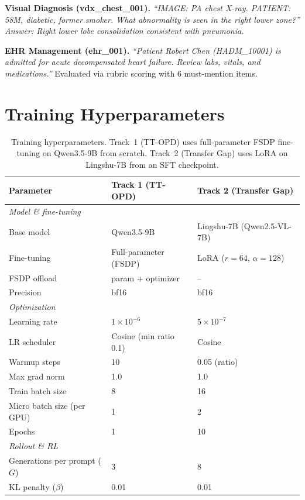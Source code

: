 \documentclass{article}
\begin{document}
\textbf{Visual Diagnosis (vdx\_chest\_001).} \emph{``IMAGE: PA chest X-ray. PATIENT: 58M, diabetic, former smoker. What abnormality is seen in the right lower zone?''} \emph{Answer: Right lower lobe consolidation consistent with pneumonia.}

\textbf{EHR Management (ehr\_001).} \emph{``Patient Robert Chen (HADM\_10001) is admitted for acute decompensated heart failure. Review labs, vitals, and medications.''} Evaluated via rubric scoring with 6 must-mention items.


\section{Training Hyperparameters}
\label{app:hyperparams}

\begin{table}[h]
\centering
\caption{Training hyperparameters. Track~1 (TT-OPD) uses full-parameter FSDP fine-tuning on Qwen3.5-9B from scratch. Track~2 (Transfer Gap) uses LoRA on Lingshu-7B from an SFT checkpoint.}
\label{tab:hyperparams}
\begin{tabular}{lll}
\toprule
\textbf{Parameter} & \textbf{Track 1 (TT-OPD)} & \textbf{Track 2 (Transfer Gap)} \\
\midrule
\multicolumn{3}{l}{\emph{Model \& fine-tuning}} \\
Base model & Qwen3.5-9B & Lingshu-7B (Qwen2.5-VL-7B) \\
Fine-tuning & Full-parameter (FSDP) & LoRA ($r{=}64$, $\alpha{=}128$) \\
FSDP offload & param + optimizer & -- \\
Precision & bf16 & bf16 \\
\midrule
\multicolumn{3}{l}{\emph{Optimization}} \\
Learning rate & $1 \times 10^{-6}$ & $5 \times 10^{-7}$ \\
LR scheduler & Cosine (min ratio 0.1) & Cosine \\
Warmup steps & 10 & 0.05 (ratio) \\
Max grad norm & 1.0 & 1.0 \\
Train batch size & 8 & 16 \\
Micro batch size (per GPU) & 1 & 2 \\
Epochs & 1 & 10 \\
\midrule
\multicolumn{3}{l}{\emph{Rollout \& RL}} \\
Generations per prompt ($G$) & 3 & 8 \\
KL penalty ($\beta$) & 0.01 & 0.01 \\

\end{tabular}
\end{table}
\end{document}

